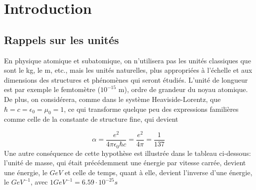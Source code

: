 

\section{Introduction}
\subsection{Rappels sur les unités}

En physique atomique et subatomique, on n'utilisera pas les unités classiques que sont le kg, le m, etc., mais les unités naturelles, plus appropriées à l'échelle et aux dimensions des structures et phénomènes qui seront étudiés. L'unité de longueur est par exemple le femtomètre ($10^{-15}$ m), ordre de grandeur du noyau atomique. De plus, on considérera, comme dans le système Heaviside-Lorentz, que  $\hbar=c=\epsilon_0=\mu_0=1$, ce qui transforme quelque peu des expressions familières comme celle de la constante de structure fine, qui devient

\[
    \alpha=\dfrac{e^2}{4\pi\epsilon_0\hbar c}=\dfrac{e^2}{4\pi}=\dfrac{1}{137}
\]
Une autre conséquence de cette hypothèse est illustrée dans le tableau ci-dessous: l'unité de masse, qui était précédemment une énergie par vitesse carrée,  devient une énergie, le $GeV$ et celle de temps, quant à elle, devient l'inverse d'une énergie, le $GeV^{-1}$, avec $1 GeV^{-1}=6.59 \cdot 10^{-25}s$


